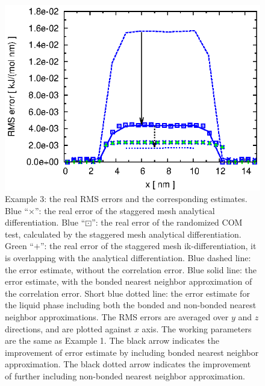 \documentclass[aps,pre,preprint,unsortedaddress]{revtex4}
\newcommand{\recheck}[1]{{\color{red} #1}}
\begin{document}
\begin{figure}
  \centering
  \includegraphics[]{fig.water.ana.st.error.more.eps}
  \caption{
    Example 3: the real RMS errors and the corresponding
    estimates. 
    Blue ``$\times$'': the real error of the staggered mesh
    analytical differentiation.
    \recheck{
    Blue ``$\boxdot$'': the real error of the
    randomized COM test, calculated by
    the staggered mesh analytical differentiation.}
    Green ``$+$'': the real error of the staggered mesh
    ik-differentiation, it is overlapping with the analytical differentiation.
    Blue dashed line: the error estimate, without the correlation error.
    Blue solid line: the error estimate, with the \recheck{bonded} nearest
    neighbor approximation of the correlation error.
    \recheck{
      Short blue dotted line: the error estimate
    for the liquid phase including both the bonded and non-bonded
    nearest neighbor approximations.}
    The RMS errors are averaged over $y$ and $z$ directions, and are
    plotted against $x$ axis.
    The working parameters are the same as Example 1.
    The black arrow indicates the improvement
    of error estimate by including \recheck{bonded} nearest neighbor
    approximation.
    \recheck{
    The black dotted arrow indicates the improvement of
    further including non-bonded nearest neighbor approximation.}
  }   
  \label{fig:water-error}
\end{figure}
\end{document}
